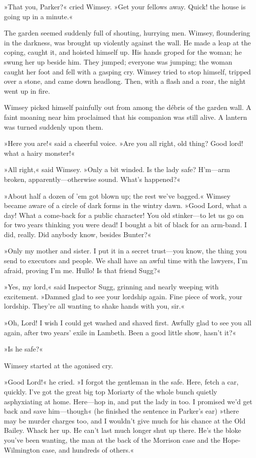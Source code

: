 »That you, Parker?« cried Wimsey. »Get your fellows away. Quick! the house is going up in a minute.«

The garden seemed suddenly full of shouting, hurrying men. Wimsey, floundering in the darkness, was brought up violently against the wall. He made a leap at the coping, caught it, and hoisted himself up. His hands groped for the woman; he swung her up beside him. They jumped; everyone was jumping; the woman caught her foot and fell with a gasping cry. Wimsey tried to stop himself, tripped over a stone, and came down headlong. Then, with a flash and a roar, the night went up in fire.

Wimsey picked himself painfully out from among the débris of the garden wall. A faint moaning near him proclaimed that his companion was still alive. A lantern was turned suddenly upon them.

»Here you are!« said a cheerful voice. »Are you all right, old thing? Good lord! what a hairy monster!«

»All right,« said Wimsey. »Only a bit winded. Is the lady safe? H'm—arm broken, apparently—otherwise sound. What's happened?«

»About half a dozen of 'em got blown up; the rest we've bagged.« Wimsey became aware of a circle of dark forms in the wintry dawn. »Good Lord, what a day! What a come-back for a public character! You old stinker—to let us go on for two years thinking you were dead! I bought a bit of black for an arm-band. I did, really. Did anybody know, besides Bunter?«

»Only my mother and sister. I put it in a secret trust—you know, the thing you send to executors and people. We shall have an awful time with the lawyers, I'm afraid, proving I'm me. Hullo! Is that friend Sugg?«

»Yes, my lord,« said Inspector Sugg, grinning and nearly weeping with excitement. »Damned glad to see your lordship again. Fine piece of work, your lordship. They're all wanting to shake hands with you, sir.«

»Oh, Lord! I wish I could get washed and shaved first. Awfully glad to see you all again, after two years' exile in Lambeth. Been a good little show, hasn't it?«

»Is he safe?«

Wimsey started at the agonised cry.

»Good Lord!« he cried. »I forgot the gentleman in the safe. Here, fetch a car, quickly. I've got the great big top Moriarty of the whole bunch quietly asphyxiating at home. Here—hop in, and put the lady in too. I promised we'd get back and save him—though« (he finished the sentence in Parker's ear) »there may be murder charges too, and I wouldn't give much for his chance at the Old Bailey. Whack her up. He can't last much longer shut up there. He's the bloke you've been wanting, the man at the back of the Morrison case and the Hope-Wilmington case, and hundreds of others.«

